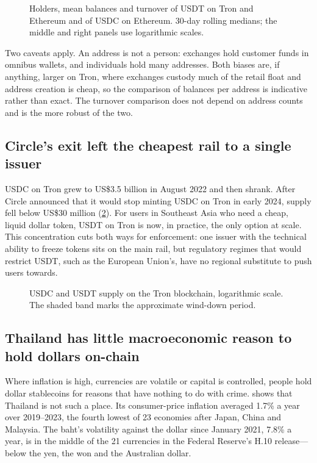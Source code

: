 \begin{figure}[!htbp]
\centering
{}
\caption{Holders, mean balances and turnover of USDT on Tron and Ethereum and of USDC on Ethereum. 30-day rolling
medians; the middle and right panels use logarithmic scales.}
\label{fig:tworails}
\end{figure}

Two caveats apply. An address is not a person: exchanges hold customer funds in omnibus wallets, and individuals hold
many addresses. Both biases are, if anything, larger on Tron, where exchanges custody much of the retail float and
address creation is cheap, so the comparison of balances per address is indicative rather than exact. The turnover
comparison does not depend on address counts and is the more robust of the two.

\subsection{Circle's exit left the cheapest rail to a single issuer}\label{sec:usdcexit}

USDC on Tron grew to US\$3.5 billion in August 2022 and then shrank. After Circle announced that it would stop minting
USDC on Tron in early 2024, supply fell below US\$30 million (\cref{fig:usdcexit}). For users in Southeast Asia who
need a cheap, liquid dollar token, USDT on Tron is now, in practice, the only option at scale. This concentration cuts
both ways for enforcement: one issuer with the technical ability to freeze tokens sits on the main rail, but
regulatory regimes that would restrict USDT, such as the European Union's, have no regional substitute to push users
towards.

\begin{figure}[!htbp]
\centering
{}
\caption{USDC and USDT supply on the Tron blockchain, logarithmic scale. The shaded band marks the approximate
wind-down period.}
\label{fig:usdcexit}
\end{figure}

\subsection{Thailand has little macroeconomic reason to hold dollars on-chain}\label{sec:macro}

Where inflation is high, currencies are volatile or capital is controlled, people hold dollar stablecoins for reasons
that have nothing to do with crime.  shows that Thailand is not such a place. Its consumer-price
inflation averaged 1.7\% a year over 2019--2023, the fourth lowest of 23 economies after Japan, China and Malaysia. The
baht's volatility against the dollar since January 2021, 7.8\% a year, is in the middle of the 21 currencies in the
Federal Reserve's H.10 release---below the yen, the won and the Australian dollar.

